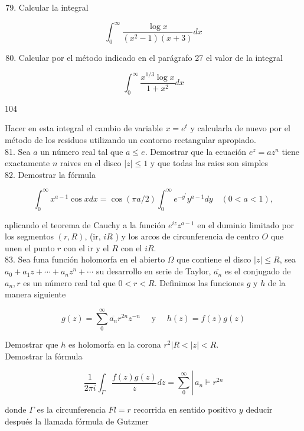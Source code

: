 \documentclass[10pt]{article}
\theoremstyle{plain}
\theoremstyle{definition}
\theoremstyle{remark}
\begin{document}
\begin{enumerate}
  \setcounter{enumi}{78}
  \item Calcular la integral
\end{enumerate}

$$
\int_{0}^{\infty} \frac{\log x}{\left(x^{2}-1\right)(x+3)} d x
$$

\begin{enumerate}
  \setcounter{enumi}{79}
  \item Calcular por el método indicado en el parágrafo 27 el valor de la integral
\end{enumerate}

$$
\int_{0}^{\infty} \frac{x^{1 / 3} \log x}{1+x^{2}} d x
$$

104

Hacer en esta integral el cambio de variable $x=e^{t}$ y calcularla de nuevo por el método de los residuos utilizando un contorno rectangular apropiado.\\
81. Sea $a$ un número real tal que $a \leqslant e$. Demostrar que la ecuación $e^{z}=a z^{n}$ tiene exactamente $n$ raives en el disco $|z| \leqslant 1$ y que todas las raies son simples\\
82. Demostrar la fórmula

$$
\int_{0}^{\infty} x^{a-1} \cos x d x=\cos (\pi a / 2) \int_{0}^{\infty} e^{-y^{\prime}} y^{a-1} d y \quad(0<a<1),
$$

aplicando el teorema de Cauchy a la función $e^{i z} z^{a-1}$ en el duminio limitado por los segmentos $(r, R)$, (ir, $i R$ ) y los arcos de circunferencia de centro $O$ que unen el punto $r$ con el ir y el $R$ con el $i R$.\\
83. Sea funa función holomorfa en el abierto $\Omega$ que contiene el disco $|z| \leqslant R$, sea $a_{0}+a_{1} z+\cdots+a_{n} z^{n}+\cdots$ su desarrollo en serie de Taylor, $\overline{a_{n}}$ es el conjugado de $a_{n}, r$ es un número real tal que $0<r<R$. Definimos las funciones $g$ y $h$ de la manera siguiente

$$
g(z)=\sum_{0}^{\infty} \overline{a_{n}} r^{2 n} z^{-n} \quad \text { y } \quad h(z)=f(z) g(z)
$$

Demostrar que $h$ es holomorfa en la corona $r^{2}|R<|z|<R$.\\
Demostrar la fórmula

$$
\left.\frac{1}{2 \pi i} \int_{\Gamma} \frac{f(z) g(z)}{z} d z=\sum_{0}^{\infty} \right\rvert\, a_{n} \vDash r^{2 n}
$$

donde $\Gamma$ es la circunferencia $F l=r$ recorrida en sentido positivo $y$ deducir después la llamada fórmula de Gutzmer
\end{document}
